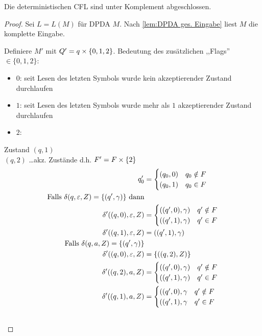 \begin{Satz}[name={[Abgeschlossenheit der deterministischen \acs*{CFL}]}]
	Die deterministischen \ac{CFL} sind unter Komplement abgeschlossen.
\end{Satz}
\begin{proof}
	Sei $L=L(M)$ für \ac{DPDA} $M$. Nach \autoref{lem:DPDA ges. Eingabe} liest $M$ die komplette Eingabe.

	Definiere $M'$ mit $Q'= q\times \{0,1,2\}$.
  Bedeutung des zusätzlichen ,,Flags'' $\in \{0,1,2\}$:
  \begin{itemize}
  \item $0$: seit Lesen des letzten Symbols wurde kein akzeptierender Zustand durchlaufen
  \item $1$: seit Lesen des letzten Symbols wurde mehr als $1$ akzeptierender Zustand durchlaufen
  \item $2$: 
  \end{itemize}
	
	Zustand $(q,1)$ \\
	\phantom{Zustand} $(q,2)$ \dots akz. Zustände d.h. $F'=F\times \{2\}$
	\begin{align*}
		q_0' &= \begin{cases}
			(q_0,0) & q_0\notin F\\
			(q_0,1) & q_0\in F
		\end{cases}\\
		\text{Falls }\delta(q,\varepsilon,Z) = \{(q',\gamma)\}\text{ dann}&\\
		\delta'((q,0),\varepsilon,Z) &= \begin{cases}
				((q',0),\gamma) & q'\notin F\\
				((q',1),\gamma) & q'\in F
			\end{cases}\\
		\delta'((q,1),\varepsilon,Z) &= ((q',1),\gamma)\\
		\text{Falls }\delta(q,a,Z) = \{(q',\gamma)\}& \\
		\delta'((q,0), \varepsilon, Z) &= \{ ((q,2), Z) \} \\
		\delta'((q,2), a, Z) &=
		    \begin{cases}
		        ((q',0), \gamma) & q' \notin F\\
		        ((q',1), \gamma) & q' \in F
		    \end{cases}\\
		\delta'((q,1), a, Z) &=
            \begin{cases}
                ((q',0), \gamma & q' \notin F\\
                ((q',1), \gamma & q' \in F
            \end{cases}
        \\ \tag*{\qedhere}
	\end{align*}
\end{proof}
